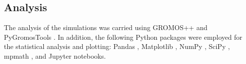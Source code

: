 \subsection{Analysis}
The analysis of the simulations was carried using GROMOS++ \cite{Eichenberger2011} and PyGromosTools \cite{Lehner2021}. In addition, the following Python packages were employed for the statistical analysis and plotting: Pandas \cite{Mckinney2010}, Matplotlib \cite{Hunter2007}, NumPy \cite{Vanderwalt2011}, SciPy \cite{Virtanen2020}, mpmath \cite{Johansson2013}, and Jupyter notebooks.\cite{Kluyver2016}
